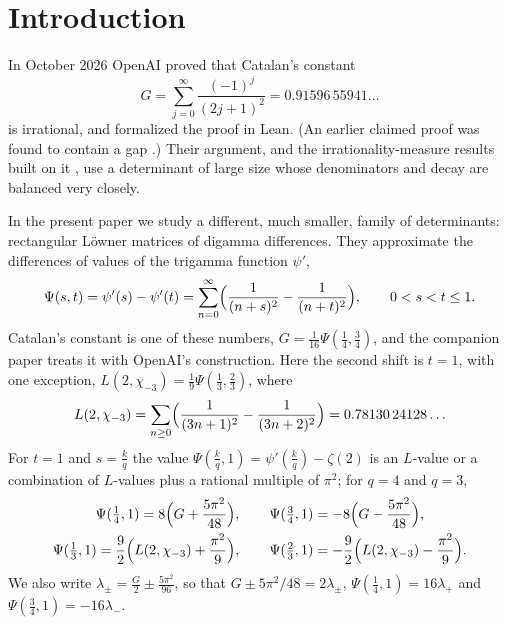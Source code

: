 \documentclass[11pt]{amsart}
\theoremstyle{definition}
\theoremstyle{remark}
\numberwithin{equation}{section}
\begin{document}
\begin{abstract}
The proof is formalized in Lean~4, with no unproved steps and only the standard axioms.
\end{abstract}

\maketitle
\tableofcontents

\section{Introduction}\label{sec:intro}

In October 2026 OpenAI \cite{OpenAI2026} proved that Catalan's constant
\[
 G=\sum_{j=0}^\infty\frac{(-1)^j}{(2j+1)^2}=0.91596\,55941\ldots
\]
is irrational, and formalized the proof in Lean. (An earlier claimed proof
\cite{Sun2026} was found to contain a gap \cite{Wachs2026}.) Their argument, and the
irrationality-measure results built on it \cite{Jha2026,Carreira2026,Litsey2026}, use a
determinant of large size whose denominators and decay are balanced very closely.

In the present paper we study a different, much smaller, family of determinants: rectangular
L\"owner matrices of digamma differences. They approximate the differences of values of the trigamma
function $\psi'$,
\[
 \Psi(s,t)=\psi'(s)-\psi'(t)=\sum_{n=0}^\infty\Bigl(\frac1{(n+s)^2}-\frac1{(n+t)^2}\Bigr),\qquad 0<s<t\le1 .
\]
Catalan's constant is one of these numbers, $G=\frac1{16}\Psi(\frac14,\frac34)$, and the companion paper
\cite{Litsey2026} treats it with OpenAI's construction. Here the second shift is $t=1$, with one exception,
$L(2,\chi_{-3})=\frac19\Psi(\frac13,\frac23)$, where
\[
 L(2,\chi_{-3})=\sum_{n\ge0}\Bigl(\frac1{(3n+1)^2}-\frac1{(3n+2)^2}\Bigr)=0.78130\,24128\ldots
\]
For $t=1$ and $s=\frac kq$ the value $\Psi(\frac kq,1)=\psi'(\frac kq)-\zeta(2)$ is an $L$-value or a
combination of $L$-values plus a rational multiple of $\pi^2$; for $q=4$ and $q=3$,
\begin{gather*}
 \Psi(\tfrac14,1)=8\Bigl(G+\frac{5\pi^2}{48}\Bigr),\qquad \Psi(\tfrac34,1)=-8\Bigl(G-\frac{5\pi^2}{48}\Bigr),\\
 \Psi(\tfrac13,1)=\frac92\Bigl(L(2,\chi_{-3})+\frac{\pi^2}9\Bigr),\qquad
 \Psi(\tfrac23,1)=-\frac92\Bigl(L(2,\chi_{-3})-\frac{\pi^2}9\Bigr).
\end{gather*}
We also write $\lambda_\pm=\frac G2\pm\frac{5\pi^2}{96}$, so that $G\pm5\pi^2/48=2\lambda_\pm$,
$\Psi(\frac14,1)=16\lambda_+$ and $\Psi(\frac34,1)=-16\lambda_-$.
\end{document}

